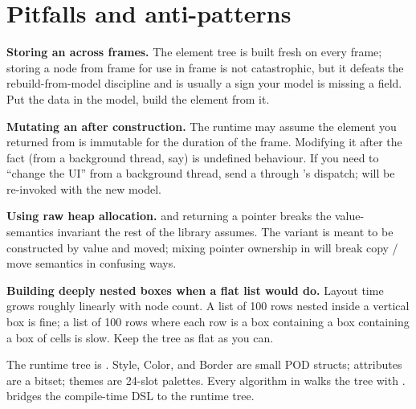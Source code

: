 \section{Pitfalls and anti-patterns}
\label{sec:elem:pitfalls}

\begin{warning}
\textbf{Storing an  across frames.} The element tree is
built fresh on every frame; storing a node from frame  for
use in frame  is not catastrophic, but it defeats the
rebuild-from-model discipline and is usually a sign your model is
missing a field. Put the data in the model, build the element from
it.
\end{warning}

\begin{warning}
\textbf{Mutating an  after construction.} The runtime
may assume the element you returned from  is
immutable for the duration of the frame. Modifying it after the
fact (from a background thread, say) is undefined behaviour. If you
need to ``change the UI'' from a background thread, send a
 through 's dispatch;  will be
re-invoked with the new model.
\end{warning}

\begin{warning}
\textbf{Using raw heap allocation.} 
and returning a pointer breaks the value-semantics invariant the
rest of the library assumes. The  variant is meant to
be constructed by value and moved; mixing pointer ownership in
will break copy / move semantics in confusing ways.
\end{warning}

\begin{warning}
\textbf{Building deeply nested boxes when a flat list would do.}
Layout time grows roughly linearly with node count. A list of 100
rows nested inside a vertical box is fine; a list of 100 rows where
each row is a box containing a box containing a box of cells is
slow. Keep the tree as flat as you can.
\end{warning}

\begin{recap}
The runtime tree is . Style, Color, and Border are small POD structs;
attributes are a bitset; themes are 24-slot palettes. Every
algorithm in \maya{} walks the tree with .
 bridges the compile-time DSL to the runtime tree.
\end{recap}

